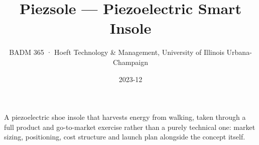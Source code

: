 \title{Piezsole --- Piezoelectric Smart Insole}
\subtitle{BADM 365 · Hoeft Technology \& Management, University of Illinois Urbana-Champaign}
\date{2023-12}




A piezoelectric shoe insole that harvests energy from walking, taken through a
full product and go-to-market exercise rather than a purely technical one:
market sizing, positioning, cost structure and launch plan alongside the
concept itself.



